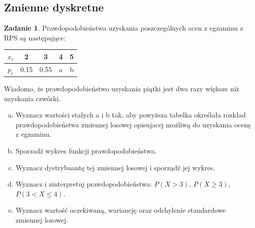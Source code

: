 \documentclass[11pt]{article}
\theoremstyle{definition}
\newtheorem{zadanie}{Zadanie}
\numberwithin{zadanie}{section}
\begin{document}
\newpage
\subsection{Zmienne dyskretne}

\begin{zadanie}
    Prawdopodobieństwa uzyskania poszczególnych ocen z egzaminu z RPS są następujące:

    \begin{center}
        \begin{tabular}{ |c|c|c|c|c| }
            \hline
            $x_i$ & 2    & 3    & 4 & 5 \\
            \hline
            $p_i$ & 0.15 & 0.55 & a & b \\
            \hline
        \end{tabular}
    \end{center}

    Wiadomo, że prawdopodobieństwo uzyskania piątki jest dwa razy większe niż uzyskania czwórki.

    \begin{enumerate}[a)]
        \item Wyznacz wartości stałych a i b tak, aby powyższa tabelka określała rozkład prawdopodobieństwa zmiennej losowej opisujacej możliwą do uzyskania ocenę z egzaminu.
        \item Sporzadź wykres funkcji prawdopodobieństwa.
        \item Wyznacz dystrybuantę tej zmiennej losowej i sporządź jej wykres.
        \item Wyznacz i zinterpretuj prawdopodobieństwa: $P (X > 3)$, $P (X \geq 3)$, $P (3 < X \leq 4)$.
        \item Wyznacz wartość oczekiwaną, wariancję oraz odchylenie standardowe zmiennej losowej.
    \end{enumerate}
\end{zadanie}
\end{document}
